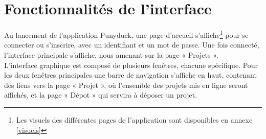 \documentclass[twoside]{report}
\begin{document}
\begin{center}
\end{center}
\section{Fonctionnalités de l'interface}
Au lancement de l'application Punyduck, une page d'accueil s'affiche\footnote{\label{note2}Les visuels des différentes pages de l'application sont disponibles en annexe \ref{visuels}} pour se connecter ou s'inscrire, avec un identifiant et un mot de passe. Une fois connecté, l’interface principale s'affiche, nous amenant sur la page « Projets ». \\
L'interface graphique est composé de plusieurs fenêtres, chacune spécifique. Pour les deux fenêtres principales une barre de navigation s'affiche en haut, contenant des liens vers la page « Projet », où l'ensemble des projets mis en ligne seront affichés, et la page « Dépot » qui servira à déposer un projet. \\
\end{document}
